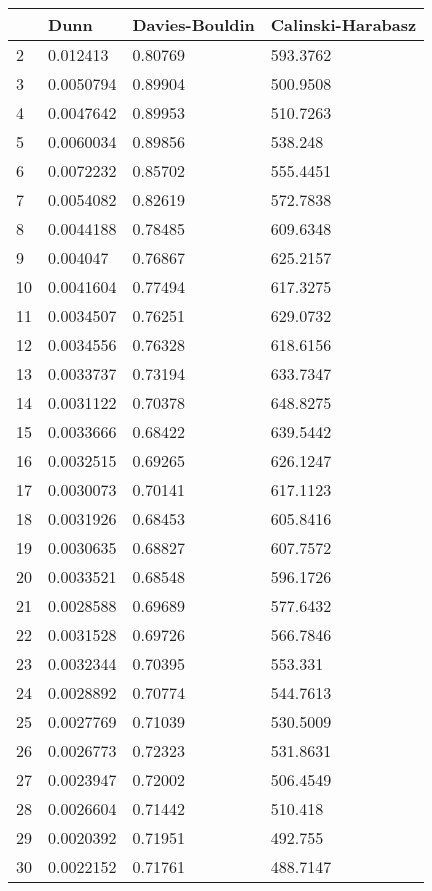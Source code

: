 \begin{tabular}{llll}
& Dunn & Davies-Bouldin & Calinski-Harabasz \\ 
\hline 
2 & 0.012413 & 0.80769 & 593.3762 \\ 
3 & 0.0050794 & 0.89904 & 500.9508 \\ 
4 & 0.0047642 & 0.89953 & 510.7263 \\ 
5 & 0.0060034 & 0.89856 & 538.248 \\ 
6 & 0.0072232 & 0.85702 & 555.4451 \\ 
7 & 0.0054082 & 0.82619 & 572.7838 \\ 
8 & 0.0044188 & 0.78485 & 609.6348 \\ 
9 & 0.004047 & 0.76867 & 625.2157 \\ 
10 & 0.0041604 & 0.77494 & 617.3275 \\ 
11 & 0.0034507 & 0.76251 & 629.0732 \\ 
12 & 0.0034556 & 0.76328 & 618.6156 \\ 
13 & 0.0033737 & 0.73194 & 633.7347 \\ 
14 & 0.0031122 & 0.70378 & 648.8275 \\ 
15 & 0.0033666 & 0.68422 & 639.5442 \\ 
16 & 0.0032515 & 0.69265 & 626.1247 \\ 
17 & 0.0030073 & 0.70141 & 617.1123 \\ 
18 & 0.0031926 & 0.68453 & 605.8416 \\ 
19 & 0.0030635 & 0.68827 & 607.7572 \\ 
20 & 0.0033521 & 0.68548 & 596.1726 \\ 
21 & 0.0028588 & 0.69689 & 577.6432 \\ 
22 & 0.0031528 & 0.69726 & 566.7846 \\ 
23 & 0.0032344 & 0.70395 & 553.331 \\ 
24 & 0.0028892 & 0.70774 & 544.7613 \\ 
25 & 0.0027769 & 0.71039 & 530.5009 \\ 
26 & 0.0026773 & 0.72323 & 531.8631 \\ 
27 & 0.0023947 & 0.72002 & 506.4549 \\ 
28 & 0.0026604 & 0.71442 & 510.418 \\ 
29 & 0.0020392 & 0.71951 & 492.755 \\ 
30 & 0.0022152 & 0.71761 & 488.7147 \\ 
\hline 
\end{tabular}